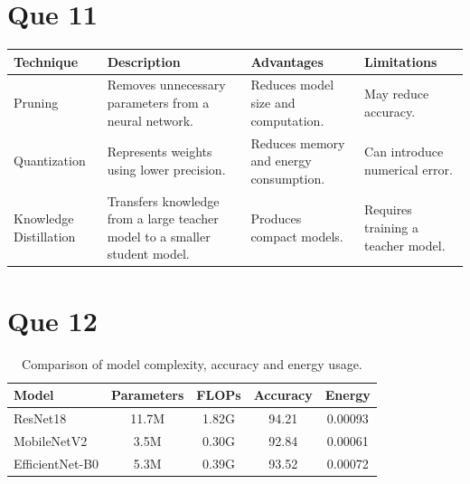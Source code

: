 \documentclass[12pt,a4paper]{article}
\begin{document}
	\section*{Que 11}
	\begin{center}
		\begin{tabular}{|>{\raggedright\arraybackslash}p{2.4cm}|
				>{\raggedright\arraybackslash}p{3.8cm}|
				>{\raggedright\arraybackslash}p{3.4cm}|
				>{\raggedright\arraybackslash}p{3.6cm}|}
			\hline
			\textbf{Technique} & \textbf{Description} & \textbf{Advantages} & \textbf{Limitations} \\
			\hline
			Pruning &
			Removes unnecessary parameters from a neural network. &
			Reduces model size and computation. &
			May reduce accuracy. \\
			\hline
			Quantization &
			Represents weights using lower precision. &
			Reduces memory and energy consumption. &
			Can introduce numerical error. \\
			\hline
			Knowledge Distillation &
			Transfers knowledge from a large teacher model to a smaller student model. &
			Produces compact models. &
			Requires training a teacher model. \\
			\hline
		\end{tabular}
	\end{center}
	
	\section*{Que 12}
	\begin{table}[h]
		\centering
		\caption{Comparison of model complexity, accuracy and energy usage.}
		\label{tab:model-comparison}
		\begin{tabular}{lcccc}
			\toprule
			Model & Parameters & FLOPs & Accuracy & Energy \\
			\midrule
			ResNet18        & 11.7M & 1.82G & 94.21 & 0.00093 \\
			MobileNetV2     & 3.5M  & 0.30G & 92.84 & 0.00061 \\
			EfficientNet-B0 & 5.3M  & 0.39G & 93.52 & 0.00072 \\
			\bottomrule
		\end{tabular}
	\end{table}
	
\end{document}
